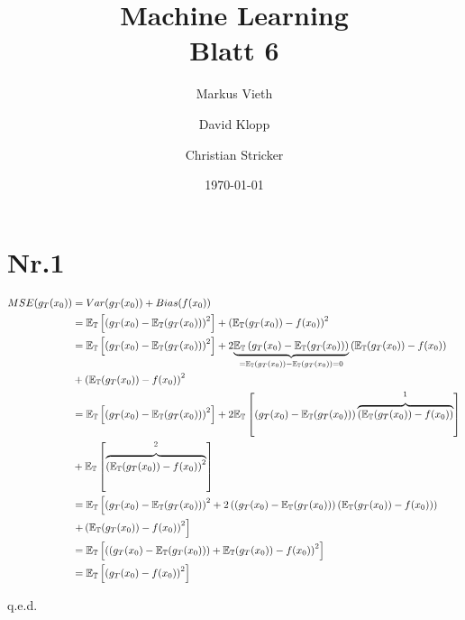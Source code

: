 \documentclass[a4paper,11pt,twoside]{scrartcl}
\title{Machine Learning\\ Blatt 6}
\author{Markus Vieth\and David Klopp\and Christian Stricker}
\date{\today}
\begin{document}
\newcommand{\cor}[1]{\textcolor{red}{\textit{#1}}}
\maketitle
\cleardoublepage
\pagestyle{myheadings}

\newpage

\section*{Nr.1}
\begin{align*}
 MSE( g_T(x_0) ) &= Var(g_T(x_0)) + Bias(f(x_0)) \\
 &= \mathbb{E_T}\left[ \left( g_T(x_0) - \mathbb{E_T}( g_T(x_0) ) \right)^2 \right] + \left( \mathbb{E_T}(g_T(x_0)) - f(x_0) \right)^2\\
 &= \mathbb{E_T}\left[ \left( g_T(x_0) - \mathbb{E_T}( g_T(x_0) ) \right)^2 \right] + 2\underset{=\mathbb{E_T}(g_T(x_0)) - \mathbb{E_T}(g_T(x_0)) = 0}{\underbrace{\mathbb{E_T}\left( g_T(x_0) - \mathbb{E_T}(g_T(x_0)) \right)}}\left( \mathbb{E_T}(g_T(x_0)) - f(x_0) \right) \\
 &+ \left( \mathbb{E_T}(g_T(x_0)) - f(x_0) \right)^2\\
 &= \mathbb{E_T}\left[ \left( g_T(x_0) - \mathbb{E_T}( g_T(x_0) ) \right)^2 \right] + 2\mathbb{E_T}\left[\left( g_T(x_0) - \mathbb{E_T}(g_T(x_0)) \right)\overset{\footnotemark}{\overbrace{\left( \mathbb{E_T}(g_T(x_0)) - f(x_0) \right)}}\right] \\
 &+ \mathbb{E_T}\left[\overset{\footnotemark}{\overbrace{\left( \mathbb{E_T}(g_T(x_0)) - f(x_0) \right)^2}}\right]\\ 
  &= \mathbb{E_T}\left[ \left( g_T(x_0) - \mathbb{E_T}( g_T(x_0) ) \right)^2  + 2\left(\left( g_T(x_0) - \mathbb{E_T}(g_T(x_0)) \right)\left( \mathbb{E_T}(g_T(x_0)) - f(x_0) \right)\right)\right . \\
  &\left .+ \left( \mathbb{E_T}(g_T(x_0)) - f(x_0) \right)^2\right]\\
  &= \mathbb{E_T}\left[ \left(\left( g_T(x_0) - \mathbb{E_T}( g_T(x_0) ) \right) + \mathbb{E_T}(g_T(x_0)) - f(x_0)\right)^2 \right]\\
  &= \mathbb{E_T}\left[ \left( g_T(x_0) - f(x_0) \right)^2 \right]
\end{align*}
\begin{flushright}
	q.e.d.
\end{flushright}
\addtocounter{footnote}{-1}
\end{document}
